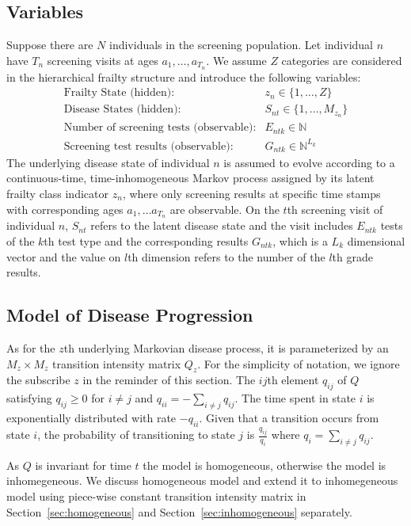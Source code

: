 \documentclass{article}
\begin{document}
\subsection{Variables}
Suppose there are $N$ individuals in the screening population.  Let individual $n$ have $T_n$ screening visits at ages $a_1, \ldots, a_{T_n}$. We assume $Z$ categories are considered in the hierarchical frailty structure and introduce the following variables:
\begin{eqnarray}
\textrm{Frailty State (hidden):} & z_{n} \in \{1, \ldots, Z\} \nonumber \\
\textrm{Disease States (hidden):} & S_{nt} \in \{1, \ldots, M_{z_n}\} \nonumber \\
\textrm{Number of screening tests (observable):} & E_{ntk} \in \mathbb{N} \nonumber \\
\textrm{Screening test results (observable):} & G_{ntk} \in \mathbb{N}^{L_k} \nonumber 
\end{eqnarray}
The underlying disease state of individual $n$ is assumed to evolve according to a continuous-time, time-inhomogeneous Markov process assigned by its latent frailty class indicator $z_n$, where only screening results at specific time stamps with corresponding ages $a_1, \ldots a_{T_n}$ are observable. On the $t$th screening visit of individual $n$, $S_{nt}$ refers to the latent disease state and the visit includes $E_{ntk}$ tests of the $k$th test type and the corresponding results $G_{ntk}$, which is a $L_k$ dimensional vector and the value on $l$th dimension refers to the number of the $l$th grade results. 

\subsection{Model of Disease Progression}
As for the $z$th underlying Markovian disease process, it is parameterized by an $M_z \times M_z$ transition intensity matrix $Q_z$. For the simplicity of notation, we ignore the subscribe $z$ in the reminder of this section. The $ij$th element $q_{ij}$ of $Q$ satisfying $q_{ij} \geq 0$ for $i\neq j$ and $q_{ii} = -\sum_{i\neq j}q_{ij}$.    
The time spent in state $i$ is exponentially distributed with rate $-q_{ii}$.  Given that a transition occurs from state $i$,  the probability of transitioning to state $j$ is $\frac{q_{ij}}{q_i}$ where $q_i = \sum_{i\neq j}q_{ij}$.

As $Q$ is invariant for time $t$ the model is homogeneous, otherwise the model is inhomegeneous. We discuss homogeneous model and extend it to inhomegeneous model using piece-wise constant transition intensity matrix in Section~\ref{sec:homogeneous} and Section~\ref{sec:inhomogeneous} separately.
\end{document}
